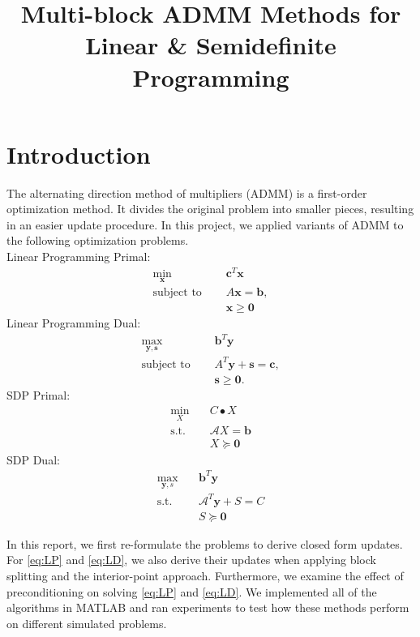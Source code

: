 \documentclass{article}
\title{Multi-block ADMM Methods for Linear \& Semidefinite Programming }
\author{\studentname}
\begin{document}
\maketitle
\vspace{0.1in}
\maketitle



\section{Introduction}
The alternating direction method of multipliers (ADMM) is a first-order optimization method. It divides the original problem into smaller pieces, resulting in an easier update procedure. In this project, we applied variants of ADMM to the following optimization problems. \\
Linear Programming Primal:
\begin{align}
\min_{\mathbf{x}} &\quad \mathbf{c}^T\mathbf{x} \tag{LP}\label{eq:LP} \\
\text{subject to } &\quad  A \mathbf{x} = \mathbf{b},  \nonumber \\
&\quad \mathbf{x} \geq \mathbf{0} \nonumber 
\end{align}
Linear Programming Dual:
\begin{align}
\max_{\mathbf{y}, \mathbf{s}} &\quad \mathbf{b}^T\mathbf{y}  \tag{LD}\label{eq:LD} \\
\text{subject to } &\quad  A^T \mathbf{y}  + \mathbf{s} = \mathbf{c},  \nonumber \\
&\quad \mathbf{s} \geq \mathbf{0} \nonumber.
\end{align}
SDP Primal:
\begin{align}
\min_{X} &\quad C\bullet X  \tag{SDP}\label{eq:SDP} \\
\text{s.t.} &\quad \mathcal{A}X=\mathbf{b} \nonumber \\
&\quad X\succeq \mathbf{0} \nonumber
\end{align}
SDP Dual:
\begin{align}
\max_{\mathbf{y},s} &\quad \mathbf{b}^{T}\mathbf{y} \tag{SDD}\label{eq:SDD}  \\
\text{s.t.} &\quad \mathcal{A}^{T}\mathbf{y}+S=C \nonumber \\
&\quad S\succeq\mathbf{0} \nonumber
\end{align}

In this report, we first re-formulate the problems to derive closed form updates. For \eqref{eq:LP} and \eqref{eq:LD}, we also derive their updates when applying block splitting and the interior-point approach. Furthermore, we examine the effect of preconditioning on solving \eqref{eq:LP} and \eqref{eq:LD}. We implemented all of the algorithms in MATLAB and ran experiments to test how these methods perform on different simulated problems.
\end{document}
